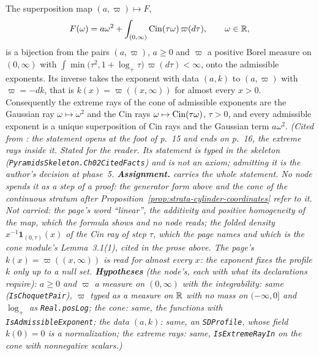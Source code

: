 \begin{theorem}
\label{thm:cited-A15}
\notready
The superposition map $(a, \varpi) \mapsto F$,
\[
  F(\omega) = a\omega^2 + \int_{(0,\infty)}\operatorname{Cin}(\tau\omega)\,\varpi(d\tau), \qquad \omega \in \mathbb{R},
\]
is a bijection from the pairs $(a, \varpi)$, $a \ge 0$ and $\varpi$ a positive Borel measure on
$(0,\infty)$ with $\int\min\bigl(\tau^2, 1 + \log_+\tau\bigr)\,\varpi(d\tau) < \infty$, onto the
admissible exponents. Its inverse takes the exponent with data $(a, k)$ to $(a, \varpi)$ with
$\varpi = -dk$, that is $k(x) = \varpi((x,\infty))$ for almost every $x > 0$. Consequently the
extreme rays of the cone of admissible exponents are the Gaussian ray $\omega \mapsto \omega^2$
and the Cin rays $\omega \mapsto \operatorname{Cin}(\tau\omega)$, $\tau > 0$, and every admissible exponent is a
unique superposition of Cin rays and the Gaussian term $a\omega^2$.
\statusA\quad{}\quad\emph{(Cited from : the
statement opens at the foot of p.~15 and ends on p.~16, the extreme rays inside it. Stated for the
reader. Its statement is typed in the skeleton (\texttt{PyramidsSkeleton.Ch02CitedFacts}) and is
not an axiom; admitting it is the author's decision at phase~5. \textbf{Assignment.} 
carries the whole statement. No node spends it as a step of a proof: the generator form above and
the cone of the continuous stratum after Proposition~\ref{prop:strata-cylinder-coordinates} refer
to it. Not carried: the page's word ``linear'', the additivity and positive homogeneity of the map,
which the formula shows and no node reads; the folded \Levy{} density
$x^{-1}\mathbf{1}_{(0,\tau)}(x)$ of the Cin ray of step $\tau$, which the page names and which is
the cone module's Lemma~3.1(1), cited in the prose above. The page's $k(x) = \varpi((x,\infty))$
is read for almost every $x$: the exponent fixes the profile $k$ only up to a null set.
\textbf{Hypotheses} (the node's, each with what its declarations require): $a \ge 0$ and $\varpi$ a
measure on $(0,\infty)$ with the integrability: same (\texttt{IsChoquetPair}), $\varpi$ typed as a
measure on $\mathbb{R}$ with no mass on $(-\infty, 0]$ and $\log_+$ as \texttt{Real.posLog}; the cone: same,
the functions with \texttt{IsAdmissibleExponent}; the data $(a, k)$: same, an \texttt{SDProfile},
whose field $k(0) = 0$ is a normalization; the extreme rays: same, \texttt{IsExtremeRayIn} on the
cone with nonnegative scalars.)}
\end{theorem}

